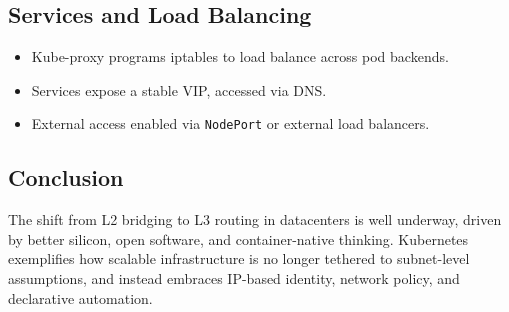 \subsection{Services and Load Balancing}

\begin{itemize}
  \item Kube-proxy programs iptables to load balance across pod backends.
  \item Services expose a stable VIP, accessed via DNS.
  \item External access enabled via \texttt{NodePort} or external load balancers.
\end{itemize}

\subsection{Conclusion}

The shift from L2 bridging to L3 routing in datacenters is well underway, driven by better silicon, open software, and container-native thinking. Kubernetes exemplifies how scalable infrastructure is no longer tethered to subnet-level assumptions, and instead embraces IP-based identity, network policy, and declarative automation.

%
%
%	



